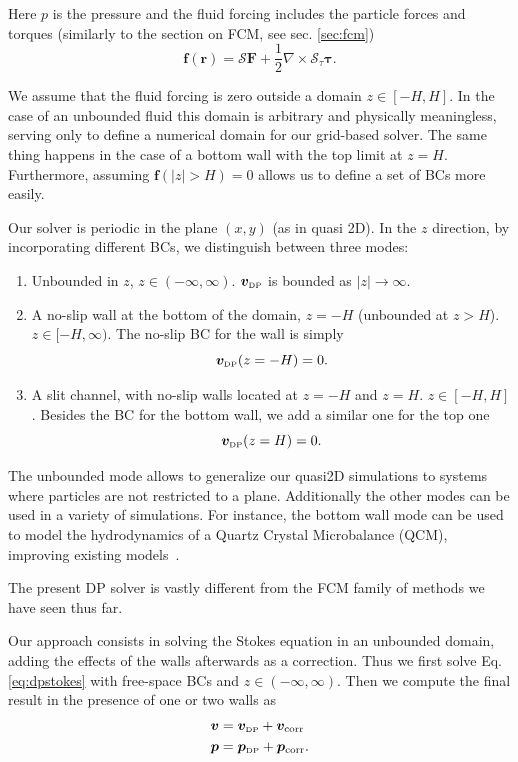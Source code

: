\documentclass[ twoside,openright,titlepage,numbers=noenddot,%
headinclude,footinclude,cleardoublepage=empty,abstract=on,
BCOR=5mm,paper=b5,fontsize=11pt, dvipsnames
]{scrreprt}
\renewcommand{\vec}[1]{\bm{#1}}
\newcommand{\oper}[1]{\mathcal{#1}}
\newcommand{\half}{\frac{1}{2}}
\newcommand{\fpos}{r}
\newcommand{\fvel}{v}
\newcommand{\corr}{\text{corr}}
\newcommand{\dpr}{\text{\tiny DP}}
\begin{document}
Here $p$ is the pressure and the fluid forcing includes the particle forces and torques (similarly to the section on \gls{FCM}, see sec. \ref{sec:fcm})
\begin{equation}
  \vec{f}(\vec{\fpos}) = \oper{S}\vec{F} + \half\nabla\times\oper{S}_{\tau}\vec{\tau}.
\end{equation}

We assume that the fluid forcing is zero outside a domain $z\in [-H, H]$. In the case of an unbounded fluid this domain is arbitrary and physically meaningless, serving only to define a numerical domain for our grid-based solver. The same thing happens in the case of a bottom wall with the top limit at $z=H$. Furthermore, assuming $\vec{f}(|z|>H) = 0$ allows us to define a set of \glspl{BC} more easily.

Our solver is periodic in the plane $(x,y)$ (as in quasi 2D). In the $z$ direction, by incorporating different \glspl{BC}, we distinguish between three modes:
\begin{enumerate}
\item Unbounded in $z$, $z\in(-\infty, \infty)$. $\vec{\fvel}_{\dpr}$ is bounded as $|z|\rightarrow\infty$.
\item A no-slip  wall at the bottom of the domain, $z=-H$ (unbounded at $z>H$). $z\in [-H, \infty)$.
  The no-slip \gls{BC} for the wall is simply
  \begin{equation}
    \label{eq:dpstokesbwvelbc}
    \vec{\fvel}_{\dpr}(z=-H) = 0.   
  \end{equation} 
\item A slit channel, with no-slip walls located at $z=-H$ and $z=H$. $z\in [-H, H]$. Besides the \gls{BC} for the bottom wall, we add a similar one for the top one
  \begin{equation}
    \label{eq:dpstokestwvelbc}
    \vec{\fvel}_{\dpr}(z=H) = 0.
  \end{equation}
\end{enumerate}
The unbounded mode allows to generalize our quasi2D simulations to systems where particles are not restricted to a plane. Additionally the other modes can be used in a variety of simulations. For instance, the bottom wall mode can be used to model the hydrodynamics of a Quartz Crystal Microbalance (QCM), improving existing models~\cite{Melendez2020}.

The present \gls{DP} solver is vastly different from the \gls{FCM} family of methods we have seen thus far.

Our approach consists in solving the Stokes equation in an unbounded domain, adding the effects of the walls afterwards as a correction. Thus we first solve Eq. \eqref{eq:dpstokes} with free-space \glspl{BC} and $z\in (-\infty, \infty)$. Then we compute the final result in the presence of one or two walls as
\begin{equation}
  \label{eq:dpstokescorrsum}
  \begin{aligned}
  &\vec{\fvel} =   \vec{\fvel}_{\dpr} +   \vec{\fvel}_{\corr}\\
  &\vec{p} =   \vec{p}_{\dpr} +   \vec{p}_{\corr}.
\end{aligned}
\end{equation}
\end{document}
